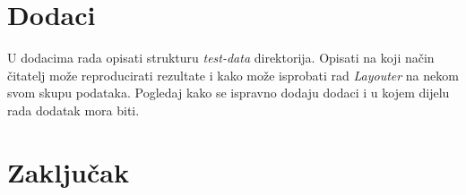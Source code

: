 \documentclass[times, utf8, zavrsni]{fer}
\begin{document}
\chapter{Dodaci}
U dodacima rada opisati strukturu \emph{test-data} direktorija. Opisati
na koji način čitatelj može reproducirati rezultate i kako može isprobati rad
\emph{Layouter} na nekom svom skupu podataka. Pogledaj kako se ispravno dodaju
dodaci i u kojem dijelu rada dodatak mora biti.

\chapter{Zaključak}




\begin{sazetak}

\kljucnerijeci{}
\end{sazetak}

\begin{abstract}

\keywords{}
\end{abstract}
\end{document}
